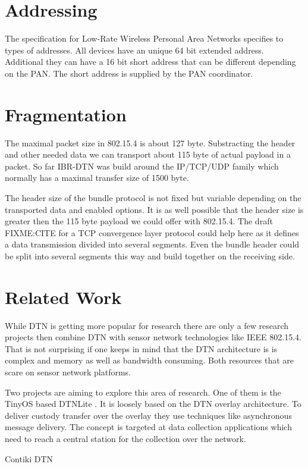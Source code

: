 \section{Addressing}

The specification for Low-Rate Wireless Personal Area Networks specifies to
types of addresses. All devices have an unique 64 bit extended address.
Additional they can have a 16 bit short address that can be different depending
on the PAN. The short address is supplied by the PAN coordinator.

\section{Fragmentation}

The maximal packet size in 802.15.4 is about 127 byte. Substracting the header
and other needed data we can transport about 115 byte of actual payload in a
packet. So far IBR-DTN was build around the IP/TCP/UDP family which normally has
a maximal transfer size of 1500 byte.

The header size of the bundle protocol is not fixed but variable depending on
the transported data and enabled options. It is as well possible that the header
size is greater then the 115 byte payload we could offer with 802.15.4. The
draft FIXME:CITE for a TCP convergence layer protocol could help here as it
defines a data transmission divided into several segments. Even the bundle
header could be split into several segments this way and build together on the
receiving side.

\section{Related Work}

While DTN is getting more popular for research there are only a few research
projects then combine DTN with sensor network technologies like IEEE 802.15.4.
That is not surprising if one keeps in mind that the DTN architecture is is
complex and memory as well as bandwidth consuming. Both resources that are scare
on sensor network platforms.

Two projects are aiming to explore this area of research. One of them is the
TinyOS based DTNLite \cite{dtnlite}. It is loosely based on the DTN overlay
architecture. To deliver custody transfer  over the overlay they use techniques
like asynchronous message delivery. The concept is targeted at data collection
applications which need to reach a central station for the collection over the
network.

Contiki DTN

